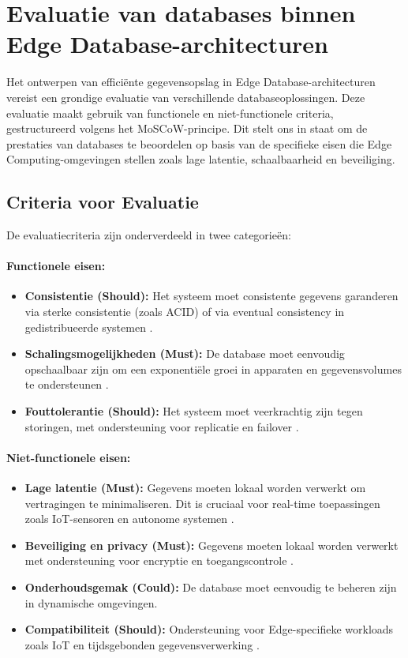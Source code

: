 \newpage

\section{Evaluatie van databases binnen Edge Database-architecturen}

Het ontwerpen van efficiënte gegevensopslag in Edge Database-architecturen vereist een grondige evaluatie van verschillende databaseoplossingen. Deze evaluatie maakt gebruik van functionele en niet-functionele criteria, gestructureerd volgens het MoSCoW-principe. Dit stelt ons in staat om de prestaties van databases te beoordelen op basis van de specifieke eisen die Edge Computing-omgevingen stellen zoals lage latentie, schaalbaarheid en beveiliging.

\subsection{Criteria voor Evaluatie}
De evaluatiecriteria zijn onderverdeeld in twee categorieën:

\paragraph{Functionele eisen:}
\begin{itemize}    
    \item \textbf{Consistentie (Should):} Het systeem moet consistente gegevens garanderen via sterke consistentie (zoals ACID) of via eventual consistency in gedistribueerde systemen \autocite{Kleppmann2017}.
    \item \textbf{Schalingsmogelijkheden (Must):} De database moet eenvoudig opschaalbaar zijn om een exponentiële groei in apparaten en gegevensvolumes te ondersteunen \autocite{CassandraDocumentation}.
    \item \textbf{Fouttolerantie (Should):} Het systeem moet veerkrachtig zijn tegen storingen, met ondersteuning voor replicatie en failover \autocite{RedisDocumentation, CassandraDocumentation}.
\end{itemize}

\paragraph{Niet-functionele eisen:}
\begin{itemize}
    \item \textbf{Lage latentie (Must):} Gegevens moeten lokaal worden verwerkt om vertragingen te minimaliseren. Dit is cruciaal voor real-time toepassingen zoals IoT-sensoren en autonome systemen \autocite{Rahmani2018, Taheri2020}.
    \item \textbf{Beveiliging en privacy (Must):} Gegevens moeten lokaal worden verwerkt met ondersteuning voor encryptie en toegangscontrole \autocite{Taheri2020}.
    \item \textbf{Onderhoudsgemak (Could):} De database moet eenvoudig te beheren zijn in dynamische omgevingen.
    \item \textbf{Compatibiliteit (Should):} Ondersteuning voor Edge-specifieke workloads zoals IoT en tijdsgebonden gegevensverwerking \autocite{TimescaleDBDocumentation}.
\end{itemize}

